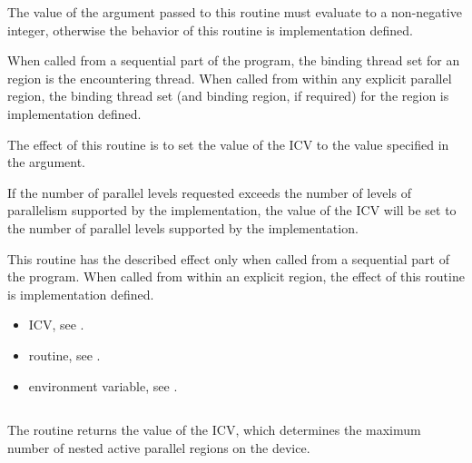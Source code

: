 \constraints
The value of the argument passed to this routine must evaluate to a non-negative integer, 
otherwise the behavior of this routine is implementation defined.

\binding
When called from a sequential part of the program, the binding thread set for an 
 region is the encountering thread. When called 
from within any explicit parallel region, the binding thread set (and binding region, if 
required) for the  region is implementation defined. 

\effect
The effect of this routine is to set the value of the  ICV to the value 
specified in the argument. 

If the number of parallel levels requested exceeds the number of levels of parallelism 
supported by the implementation, the value of the  ICV will be set 
to the number of parallel levels supported by the implementation.

This routine has the described effect only when called from a sequential part of the 
program. When called from within an explicit  region, the effect of this 
routine is implementation defined.

\crossreferences
\begin{itemize}
\item {} ICV, see 
.

\item {} routine, see 
.

\item {} environment variable, see 
.
\end{itemize}










\subsection{}
\label{subsec:omp_get_max_active_levels}
\summary
The  routine returns the value of the 
 ICV, which determines the maximum number of nested active parallel regions 
on the device. 

